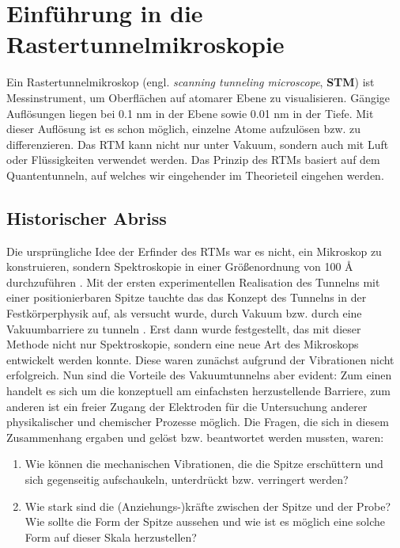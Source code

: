 \section{Einführung in die Rastertunnelmikroskopie}
Ein Rastertunnelmikroskop (engl. \textit{scanning tunneling
microscope}, \textbf{STM}) ist Messinstrument, um Oberflächen
auf atomarer Ebene zu visualisieren. Gängige Auflösungen liegen
bei 0.1 nm in der Ebene sowie 0.01 nm in der Tiefe. Mit dieser
Auflösung ist es schon möglich, einzelne Atome aufzulösen bzw.
zu differenzieren. Das RTM kann nicht nur unter
Vakuum, sondern auch mit Luft oder Flüssigkeiten verwendet werden.
Das Prinzip des RTMs basiert auf dem Quantentunneln, auf welches
wir eingehender im Theorieteil eingehen werden.
\subsection{Historischer Abriss}
Die ursprüngliche Idee der Erfinder des RTMs 
war es nicht, ein Mikroskop zu konstruieren,
sondern Spektroskopie in einer Größenordnung von 
100 \r{A} durchzuführen \cite{binnig1987scanning}.
Mit der ersten experimentellen Realisation \cite{thompson1976thermal}
des Tunnelns mit einer positionierbaren Spitze tauchte das 
das Konzept des Tunnelns in der 
Festkörperphysik auf, als versucht wurde, durch Vakuum bzw. durch
eine Vakuumbarriere zu tunneln \cite{binnig1982tunneling}. 
Erst dann wurde festgestellt, das mit dieser Methode nicht nur
Spektroskopie, sondern eine neue Art des Mikroskops entwickelt werden
konnte.
Diese
waren zunächst aufgrund der Vibrationen nicht erfolgreich. Nun sind
die Vorteile des Vakuumtunnelns aber evident: 
Zum einen handelt es sich um die konzeptuell am einfachsten
herzustellende Barriere, zum anderen ist ein freier Zugang 
der Elektroden für die Untersuchung anderer
physikalischer und chemischer Prozesse möglich.
Die Fragen, die sich in diesem Zusammenhang
ergaben und gelöst bzw. beantwortet werden mussten, waren:

\begin{enumerate}
\item Wie können die mechanischen Vibrationen, die die Spitze
erschüttern und sich gegenseitig aufschaukeln, unterdrückt bzw.
verringert werden?
\item Wie stark sind die (Anziehungs-)kräfte zwischen der Spitze
und der Probe? Wie sollte die Form der Spitze aussehen und wie
ist es möglich eine solche Form auf dieser Skala herzustellen?

\end{enumerate}

